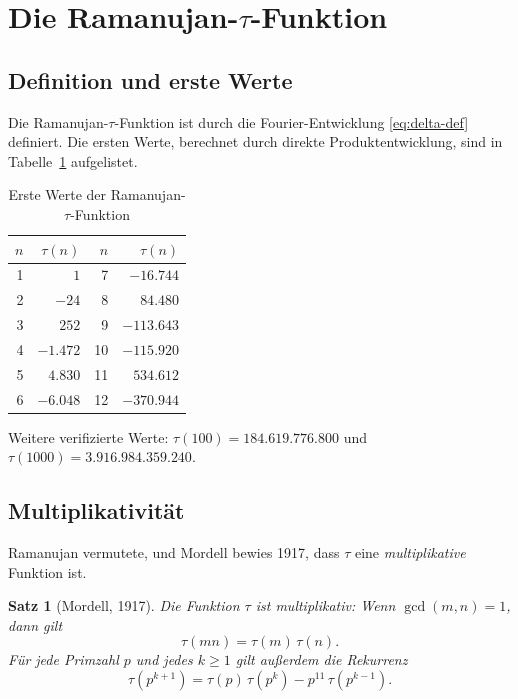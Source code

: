 \documentclass[12pt,a4paper]{amsart}
\newtheorem{theorem}{Satz}[section]
\theoremstyle{definition}
\begin{document}
\section{Die Ramanujan-$\tau$-Funktion}

\subsection{Definition und erste Werte}

Die Ramanujan-$\tau$-Funktion ist durch die Fourier-Entwicklung \eqref{eq:delta-def}
definiert. Die ersten Werte, berechnet durch direkte Produktentwicklung, sind in
Tabelle~\ref{tab:tau-werte} aufgelistet.

\begin{table}[ht]
\centering
\caption{Erste Werte der Ramanujan-$\tau$-Funktion}
\label{tab:tau-werte}
\begin{tabular}{@{}rr@{\quad}rr@{}}
\toprule
$n$ & $\tau(n)$ & $n$ & $\tau(n)$ \\
\midrule
1  & $1$           & 7  & $-16{.}744$   \\
2  & $-24$         & 8  & $84{.}480$    \\
3  & $252$         & 9  & $-113{.}643$  \\
4  & $-1{.}472$    & 10 & $-115{.}920$  \\
5  & $4{.}830$     & 11 & $534{.}612$   \\
6  & $-6{.}048$    & 12 & $-370{.}944$  \\
\bottomrule
\end{tabular}
\end{table}

\noindent Weitere verifizierte Werte: $\tau(100) = 184{.}619{.}776{.}800$ und
$\tau(1000) = 3{.}916{.}984{.}359{.}240$.

\subsection{Multiplikativität}

Ramanujan vermutete, und Mordell \cite{Mordell1917} bewies 1917, dass $\tau$ eine
\emph{multiplikative} Funktion ist.

\begin{theorem}[Mordell, 1917]\label{thm:multiplikativitaet}
  Die Funktion $\tau$ ist multiplikativ: Wenn $\gcd(m,n) = 1$, dann gilt
  \[
    \tau(mn) = \tau(m)\,\tau(n).
  \]
  Für jede Primzahl $p$ und jedes $k \geq 1$ gilt außerdem die Rekurrenz
  \begin{equation}\label{eq:hecke-rekurrenz}
    \tau(p^{k+1}) = \tau(p)\,\tau(p^k) - p^{11}\,\tau(p^{k-1}).
  \end{equation}
\end{theorem}
\end{document}
